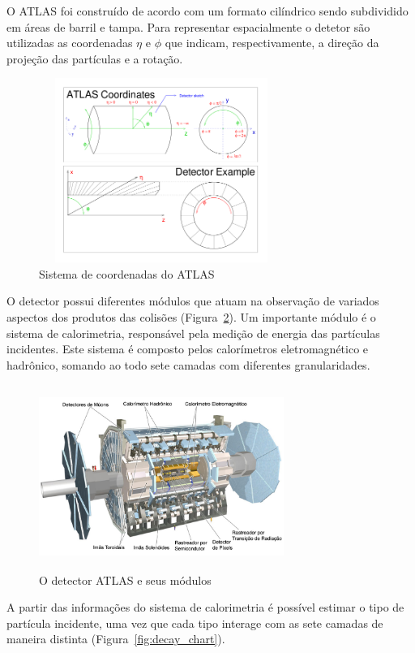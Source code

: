 \documentclass[a4paper,10pt,titlepage]{article}
\begin{document}
O ATLAS foi construído de acordo com um formato cilíndrico sendo subdividido em áreas de barril e tampa.
Para representar espacialmente o detetor são utilizadas as coordenadas $\eta$ e $\phi$ que indicam, respectivamente, a direção da projeção das partículas e a rotação.

\begin{figure}[htbp!]
 \centering
 \includegraphics[width=8cm,height=6cm]{Figs/atlas/atlas_coords.png}
 \caption{Sistema de coordenadas do ATLAS}
 \label{fig:atlas_coords}
\end{figure}

O detector possui diferentes módulos que atuam na observação de variados aspectos dos produtos das colisões (Figura~\ref{fig:atlas_detector}).
Um importante módulo é o sistema de calorimetria, responsável pela medição de energia das partículas incidentes.
Este sistema é composto pelos calorímetros eletromagnético e hadrônico, somando ao todo sete camadas com diferentes granularidades.

\begin{figure}[htbp!]
 \centering
 \includegraphics[width=8cm,height=6cm]{Figs/atlas/atlas_detector.pdf}
 \caption{O detector ATLAS e seus módulos}
 \label{fig:atlas_detector}
\end{figure}

A partir das informações do sistema de calorimetria é possível estimar o tipo de partícula incidente, uma vez que cada tipo interage com as sete camadas de maneira distinta (Figura~\ref{fig:decay_chart}).
\end{document}
